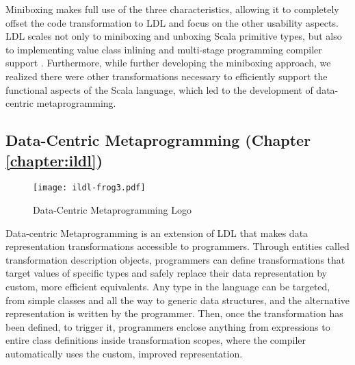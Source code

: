 %

Miniboxing makes full use of the three characteristics, allowing it to completely offset the code transformation to LDL and focus on the other usability aspects. LDL scales not only to miniboxing and unboxing Scala primitive types, but also to implementing value class inlining \cite{gosling-value-classes,rose-value-classes-tearing,rose-value-classes-vm} and multi-stage programming \cite{tiark-lms} compiler support \cite{scala-virtualized}. Furthermore, while further developing the miniboxing approach, we realized there were other transformations necessary to efficiently support the functional aspects of the Scala language, which led to the development of data-centric metaprogramming.

\subsection{Data-Centric Metaprogramming (Chapter \ref{chapter:ildl})}

\begin{wrapfigure}{r}{40mm}
  \centering
  \vspace{-2em}
  \texttt{[image: ildl-frog3.pdf]}
  \vspace{-1em}
  \caption{Data-Centric Metaprogramming Logo}
  \vspace{-2em}
\end{wrapfigure}


Data-centric Metaprogramming is an extension of LDL that makes data representation transformations accessible to programmers. Through entities called transformation description objects, programmers can define transformations that target values of specific types and safely replace their data representation by custom, more efficient equivalents. Any type in the language can be targeted, from simple classes and all the way to generic data structures, and the alternative representation is written by the programmer. Then, once the transformation has been defined, to trigger it,  programmers enclose anything from expressions to entire class definitions inside transformation scopes, where the compiler automatically uses the custom, improved representation.

